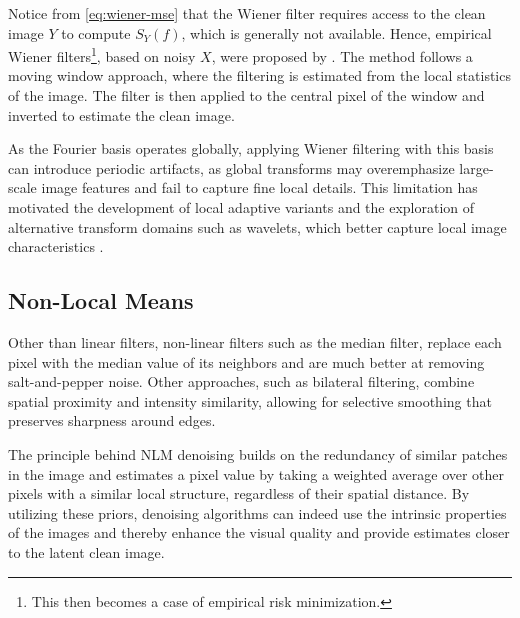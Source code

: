 Notice from \cref{eq:wiener-mse} that the Wiener filter requires access to the clean image $Y$ to compute $S_Y(f)$, which is generally not available. Hence, empirical Wiener filters\footnote{This then becomes a case of empirical risk minimization.}, based on noisy $X$, were proposed by \citeauthor{yaroslavskyDigitalPictureProcessing1985} \cite{yaroslavskyDigitalPictureProcessing1985}. The method follows a moving window approach, where the filtering is estimated from the local statistics of the image. The filter is then applied to the central pixel of the window and inverted to estimate the clean image.

As the Fourier basis operates globally, applying Wiener filtering with this basis can introduce periodic artifacts, as global transforms may overemphasize large-scale image features and fail to capture fine local details. This limitation has motivated the development of local adaptive variants and the exploration of alternative transform domains such as wavelets, which better capture local image characteristics \cite{buadesReviewImageDenoising2005}.

\subsection{Non-Local Means}

Other than linear filters, non-linear filters such as the median filter, replace each pixel with the median value of its neighbors and are much better at removing salt-and-pepper noise. Other approaches, such as bilateral filtering, combine spatial proximity and intensity similarity, allowing for selective smoothing that  preserves sharpness around edges. 

The principle behind \gls{NLM} denoising builds on the redundancy of similar patches in the image and estimates a pixel value by taking a weighted average over other pixels with a similar local structure, regardless of their spatial distance. By utilizing these priors, denoising algorithms can indeed use the intrinsic properties of the images and thereby enhance the visual quality and provide estimates closer to the latent clean image.

